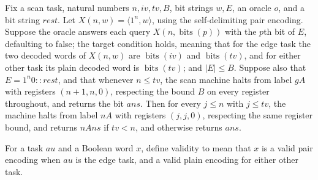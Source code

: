 \begin{lemma}
\label{BoolCircuit.AdjScan.nloop}
\leanok
{}
Fix a scan task, natural numbers $n,iv,tv,B$, bit strings $w,E$, an oracle $o$, and a
bit string $rest$. Let $X(n,w)=\langle 1^n,w\rangle$, using the self-delimiting pair
encoding. Suppose the oracle answers each query $X(n,\operatorname{bits}(p))$ with the
$p$th bit of $E$, defaulting to false; the target condition holds, meaning that for the
edge task the two decoded words of $X(n,w)$ are $\operatorname{bits}(iv)$ and
$\operatorname{bits}(tv)$, and for either other task its plain decoded word is
$\operatorname{bits}(tv)$; and $|E|\le B$. Suppose also that $E=1^n 0::rest$, and that
whenever $n\le tv$, the scan machine halts from label $gA$ with registers $(n+1,n,0)$,
respecting the bound $B$ on every register throughout, and returns the bit $ans$. Then
for every $j\le n$ with $j\le tv$, the machine halts from label $nA$ with registers
$(j,j,0)$, respecting the same register bound, and returns $nAns$ if $tv<n$, and
otherwise returns $ans$.
\end{lemma}

\begin{definition}
\label{BoolCircuit.AdjScan.Valid}
\leanok
{}
For a task $	au$ and a Boolean word $x$, define validity to mean that $x$ is a valid
pair encoding when $	au$ is the edge task, and a valid plain encoding for either other
task.
\end{definition}


